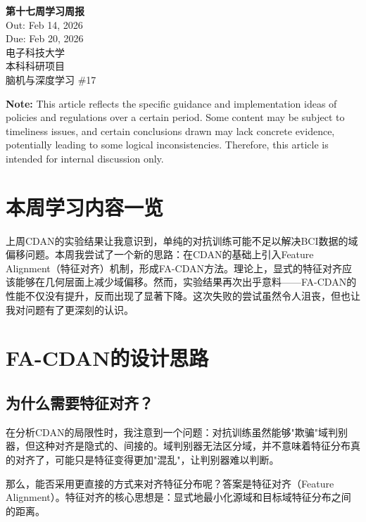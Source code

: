 \documentclass[12pt,a4paper]{ctexart}
\begin{document}
\begin{center}
    {\LARGE \textbf{第十七周学习周报}}\\[0.5cm]
    {\large Out: Feb 14, 2026}\\
    {\large Due: Feb 20, 2026}\\[0.5cm]
    {\large 电子科技大学}\\
    {\large 本科科研项目}\\
    {\large 脑机与深度学习 \#17}
\end{center}

\vspace{1cm}

\noindent \textbf{Note:} This article reflects the specific guidance and implementation ideas of policies and regulations over a certain period. Some content may be subject to timeliness issues, and certain conclusions drawn may lack concrete evidence, potentially leading to some logical inconsistencies. Therefore, this article is intended for internal discussion only.

\section{本周学习内容一览}

上周CDAN的实验结果让我意识到，单纯的对抗训练可能不足以解决BCI数据的域偏移问题。本周我尝试了一个新的思路：在CDAN的基础上引入Feature Alignment（特征对齐）机制，形成FA-CDAN方法。理论上，显式的特征对齐应该能够在几何层面上减少域偏移。然而，实验结果再次出乎意料——FA-CDAN的性能不仅没有提升，反而出现了显著下降。这次失败的尝试虽然令人沮丧，但也让我对问题有了更深刻的认识。

\section{FA-CDAN的设计思路}

\subsection{为什么需要特征对齐？}

在分析CDAN的局限性时，我注意到一个问题：对抗训练虽然能够"欺骗"域判别器，但这种对齐是隐式的、间接的。域判别器无法区分域，并不意味着特征分布真的对齐了，可能只是特征变得更加"混乱"，让判别器难以判断。

那么，能否采用更直接的方式来对齐特征分布呢？答案是特征对齐（Feature Alignment）。特征对齐的核心思想是：显式地最小化源域和目标域特征分布之间的距离。
\end{document}

